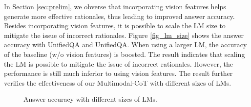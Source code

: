 \documentclass[nohyperref]{article}
\theoremstyle{plain}
\theoremstyle{definition}
\theoremstyle{remark}
\begin{document}
In Section \ref{sec:prelim}, we obverse that incorporating vision features helps generate more effective rationales, thus leading to improved answer accuracy. Besides incorporating vision features, it is possible to scale the LM size to mitigate the issue of incorrect rationales. Figure \ref{fig_lm_size} shows the answer accuracy with UnifiedQA and UnifiedQA. When using a larger LM, the accuracy of the baseline (w/o vision features) is boosted. The result indicates that scaling the LM is possible to mitigate the issue of incorrect rationales. However, the performance is still much inferior to using vision features. The result further verifies the effectiveness of our Multimodal-CoT with different sizes of LMs.




\begin{figure}[htb]
  \begin{center}
{
\pgfplotsset{width=7.0cm, height=5.5cm}
    \centering


\caption{
   Answer accuracy with different sizes of LMs.\label{fig_lm_size}
    }
}
  \end{center}
  \label{fig_scaling}
\end{figure} 
\end{document}

